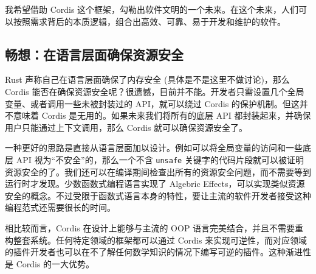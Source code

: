 \documentclass[
  chinese,
  11pt,
]{article}
\begin{document}
我希望借助 Cordis
这个框架，勾勒出软件文明的一个未来。在这个未来，人们可以按照需求背后的本质逻辑，组合出高效、可靠、易于开发和维护的软件。

\subsection{畅想：在语言层面确保资源安全}\label{ux7545ux60f3ux5728ux8bedux8a00ux5c42ux9762ux786eux4fddux8d44ux6e90ux5b89ux5168}

Rust 声称自己在语言层面确保了内存安全 (具体是不是这里不做讨论)，那么
Cordis
能否在确保资源安全呢？很遗憾，目前并不能。开发者只需设置几个全局变量、或者调用一些未被封装过的
API，就可以绕过 Cordis 的保护机制。但这并不意味着 Cordis
是无用的。如果未来我们将所有的底层 API
都封装起来，并确保用户只能通过上下文调用，那么 Cordis
就可以确保资源安全了。

一种更好的思路是直接从语言层面加以设计。例如可以将全局变量的访问和一些底层
API 视为``不安全''的，那么一个不含 \texttt{unsafe}
关键字的代码片段就可以被证明资源安全的了。我们还可以在编译期间检查出所有的资源安全问题，而不需要等到运行时才发现。少数函数式编程语言实现了
Algebric
Effects，可以实现类似资源安全的概念。不过受限于函数式语言本身的特性，要让主流的软件开发者接受这种编程范式还需要很长的时间。

相比较而言，Cordis 在设计上能够与主流的 OOP
语言完美结合，并且不需要重构整套系统。任何特定领域的框架都可以通过
Cordis
来实现可逆性，而对应领域的插件开发者也可以在不了解任何数学知识的情况下编写可逆的插件。这种渐进性是
Cordis 的一大优势。
\end{document}
